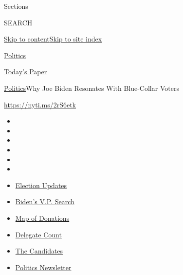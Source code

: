 Sections

SEARCH

\protect\hyperlink{site-content}{Skip to
content}\protect\hyperlink{site-index}{Skip to site index}

\href{https://www.nytimes.com/section/politics}{Politics}

\href{https://myaccount.nytimes.com/auth/login?response_type=cookie\&client_id=vi}{}

\href{https://www.nytimes.com/section/todayspaper}{Today's Paper}

\href{/section/politics}{Politics}\textbar{}Why Joe Biden Resonates With
Blue-Collar Voters

\url{https://nyti.ms/2rS6etk}

\begin{itemize}
\item
\item
\item
\item
\item
\item
\end{itemize}

\begin{itemize}
\item
  \href{https://www.nytimes.com/2020/07/31/us/elections/biden-vs-trump.html?action=click\&pgtype=Article\&state=default\&region=TOP_BANNER\&context=storylines_menu}{Election
  Updates}
\item
  \href{https://www.nytimes.com/article/biden-vice-president-2020.html?action=click\&pgtype=Article\&state=default\&region=TOP_BANNER\&context=storylines_menu}{Biden's
  V.P. Search}
\item
  \href{https://www.nytimes.com/interactive/2020/07/24/us/politics/trump-biden-campaign-donors.html?action=click\&pgtype=Article\&state=default\&region=TOP_BANNER\&context=storylines_menu}{Map
  of Donations}
\item
  \href{https://www.nytimes.com/interactive/2020/us/elections/delegate-count-primary-results.html?action=click\&pgtype=Article\&state=default\&region=TOP_BANNER\&context=storylines_menu}{Delegate
  Count}
\item
  \href{https://www.nytimes.com/interactive/2019/us/politics/2020-presidential-candidates.html?action=click\&pgtype=Article\&state=default\&region=TOP_BANNER\&context=storylines_menu}{The
  Candidates}
\item
  \href{https://www.nytimes.com/newsletters/politics?action=click\&pgtype=Article\&state=default\&region=TOP_BANNER\&context=storylines_menu}{Politics
  Newsletter}
\end{itemize}

